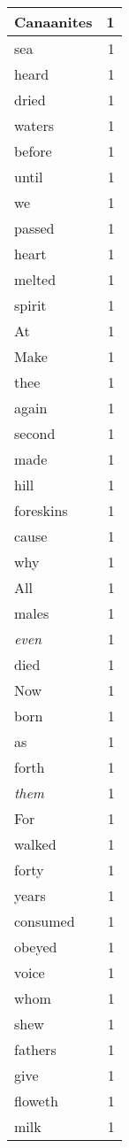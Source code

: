 \begin{center}
\begin{longtable}{l|r}
Canaanites & 1 \\ \hline
sea & 1 \\ \hline
heard & 1 \\ \hline
dried & 1 \\ \hline
waters & 1 \\ \hline
before & 1 \\ \hline
until & 1 \\ \hline
we & 1 \\ \hline
passed & 1 \\ \hline
heart & 1 \\ \hline
melted & 1 \\ \hline
spirit & 1 \\ \hline
At & 1 \\ \hline
Make & 1 \\ \hline
thee & 1 \\ \hline
again & 1 \\ \hline
second & 1 \\ \hline
made & 1 \\ \hline
hill & 1 \\ \hline
foreskins & 1 \\ \hline
cause & 1 \\ \hline
why & 1 \\ \hline
All & 1 \\ \hline
males & 1 \\ \hline
\emph{even} & 1 \\ \hline
died & 1 \\ \hline
Now & 1 \\ \hline
born & 1 \\ \hline
as & 1 \\ \hline
forth & 1 \\ \hline
\emph{them} & 1 \\ \hline
For & 1 \\ \hline
walked & 1 \\ \hline
forty & 1 \\ \hline
years & 1 \\ \hline
consumed & 1 \\ \hline
obeyed & 1 \\ \hline
voice & 1 \\ \hline
whom & 1 \\ \hline
shew & 1 \\ \hline
fathers & 1 \\ \hline
give & 1 \\ \hline
floweth & 1 \\ \hline
milk & 1 \\ \hline

\end{longtable}
\end{center}
